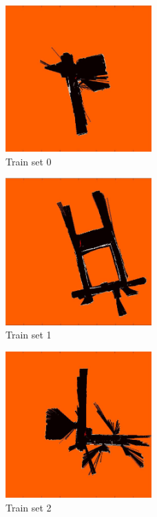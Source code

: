 \documentclass[letterpaper,twocolumn,10pt]{article}
\begin{document}
\begin{figure}[h]
    \centering
    \includegraphics[width=0.5\textwidth]{results/train0.jpg}
    \caption{Train set 0}
    \label{fig:train0}
\end{figure}
\begin{figure}[h]
    \centering
    \includegraphics[width=0.5\textwidth]{results/train1.jpg}
    \caption{Train set 1}
    \label{fig:train1}
\end{figure}
\begin{figure}[h]
    \centering
    \includegraphics[width=0.5\textwidth]{results/train2.jpg}
    \caption{Train set 2}
    \label{fig:train2}
\end{figure}
\end{document}
